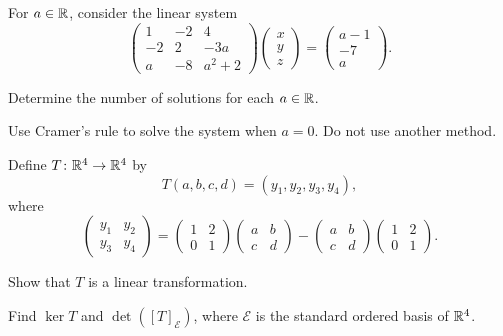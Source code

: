\documentclass[11pt,oneside]{article}
\begin{document}
\begin{problem}
For $a\in\mathbb{R}$, consider the linear system
\[
\begin{pmatrix}
1&-2&4\\
-2&2&-3a\\
a&-8&a^2+2
\end{pmatrix}
\begin{pmatrix}x\\y\\z\end{pmatrix}
=
\begin{pmatrix}a-1\\-7\\a\end{pmatrix}.
\]
\begin{problemsubparts}
\item Determine the number of solutions for each $a\in\mathbb{R}$.
\item Use Cramer's rule to solve the system when $a=0$. Do not use another method.
\end{problemsubparts}
\end{problem}

\begin{problem}
Define $T\colon\mathbb{R}^4\to\mathbb{R}^4$ by
\[
T(a,b,c,d)=(y_1,y_2,y_3,y_4),
\]
where
\[
\begin{pmatrix}y_1&y_2\\y_3&y_4\end{pmatrix}
=
\begin{pmatrix}1&2\\0&1\end{pmatrix}
\begin{pmatrix}a&b\\c&d\end{pmatrix}
-
\begin{pmatrix}a&b\\c&d\end{pmatrix}
\begin{pmatrix}1&2\\0&1\end{pmatrix}.
\]
\begin{problemsubparts}
\item Show that $T$ is a linear transformation.
\item Find $\ker T$ and $\det([T]_{\mathcal E})$, where $\mathcal E$ is the standard ordered basis of $\mathbb{R}^4$.
\end{problemsubparts}
\end{problem}
\end{document}
